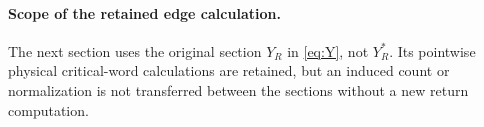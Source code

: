\documentclass[11pt,reqno]{amsart}
\numberwithin{equation}{section}
\theoremstyle{definition}\newtheorem{definition}[theorem]{Definition}
\theoremstyle{remark}\newtheorem{remark}[theorem]{Remark}
\begin{document}







\paragraph{Scope of the retained edge calculation.}
The next section uses the original section $Y_R$ in \eqref{eq:Y}, not
$Y_R^*$. Its pointwise physical critical-word calculations are retained,
but an induced count or normalization is not transferred between the
sections without a new return computation.














\clearpage

\end{document}
